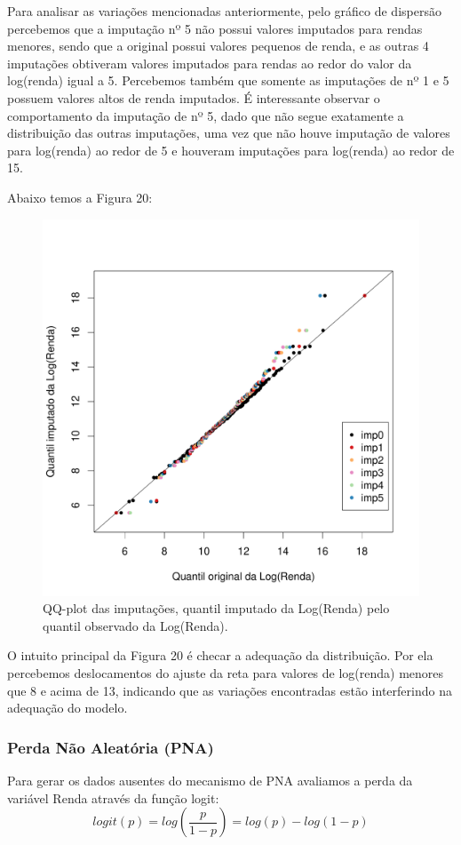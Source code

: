 \documentclass[]{article}
\begin{document}
Para analisar as variações mencionadas anteriormente, pelo gráfico de
dispersão percebemos que a imputação nº 5 não possui valores imputados
para rendas menores, sendo que a original possui valores pequenos de
renda, e as outras 4 imputações obtiveram valores imputados para rendas
ao redor do valor da log(renda) igual a 5. Percebemos também que somente
as imputações de nº 1 e 5 possuem valores altos de renda imputados. É
interessante observar o comportamento da imputação de nº 5, dado que não
segue exatamente a distribuição das outras imputações, uma vez que não
houve imputação de valores para log(renda) ao redor de 5 e houveram
imputações para log(renda) ao redor de 15.

Abaixo temos a Figura 20:

\begin{figure}[H]

{\centering \includegraphics[width=0.6\linewidth]{p53-graf} 

}

\caption{QQ-plot das imputações, quantil imputado da Log(Renda) pelo quantil observado da Log(Renda).}\label{fig:unnamed-chunk-28}
\end{figure}

O intuito principal da Figura 20 é checar a adequação da distribuição.
Por ela percebemos deslocamentos do ajuste da reta para valores de
log(renda) menores que 8 e acima de 13, indicando que as variações
encontradas estão interferindo na adequação do modelo.

\subsubsection{Perda Não Aleatória (PNA)}\label{perda-nao-aleatoria-pna}

Para gerar os dados ausentes do mecanismo de PNA avaliamos a perda da
variável Renda através da função logit:
\[logit(p) = log( \frac{p}{1-p} ) = log(p) - log(1-p)\]
\end{document}
